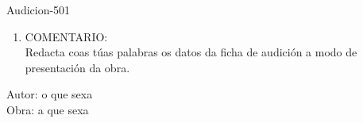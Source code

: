 \begin{defproblem}{Audicion-501}
\begin{ejercicio}[]
\begin{enumerate}[1.-]
\begin{multicols}{2}
\begin{enumerate}[a)]
				\small{
				Estamos ante:
				}
			\begin{itemize}
                \item
			     Música relixiosa (sacra)
                 \item
			     Música vocal relixiosa (música sacra)
			     \item
			     Música profana
			     \item
			     Canción profana (popular)
			\end{itemize}
		    \end{enumerate}
    \end{multicols}
    \item
    COMENTARIO:\\
    {\small Redacta coas túas palabras os datos da ficha de audición a modo de presentación da obra.}
    \par
    \vspace{2.80cm}
	\end{enumerate}
\end{ejercicio}

\begin{onlysolution}
    \begin{solution}
Autor: o que sexa\\
Obra: a que sexa\\
    \end{solution}
\end{onlysolution}

\end{defproblem}
% 
%
%


